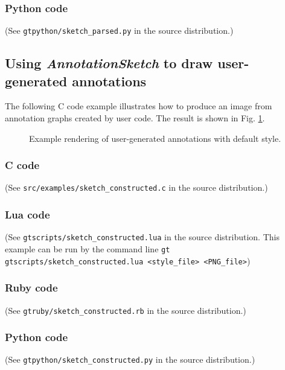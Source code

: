 \documentclass[a4paper]{scrreprt}
\begin{document}
\subsubsection{Python code}
(See \texttt{gtpython/sketch\_parsed.py} in the source distribution.)


\subsection{Using \emph{AnnotationSketch} to draw user-generated annotations}
The following C code example illustrates how to produce an image from annotation graphs created by user code.
 The result is shown in Fig. \ref{constructed_img}.

\begin{figure}
\caption{Example rendering of user-generated annotations with default style.}
\label{constructed_img}
\end{figure}

\subsubsection{C code}
(See \texttt{src/examples/sketch\_constructed.c} in the source distribution.)

\subsubsection{Lua code}
(See \texttt{gtscripts/sketch\_constructed.lua} in the source distribution.  This example can be run by the command line \texttt{gt gtscripts/sketch\_constructed.lua <style\_file> <PNG\_file>})

\subsubsection{Ruby code}
(See \texttt{gtruby/sketch\_constructed.rb} in the source distribution.)

\subsubsection{Python code}
(See \texttt{gtpython/sketch\_constructed.py} in the source distribution.)



%
\end{document}
